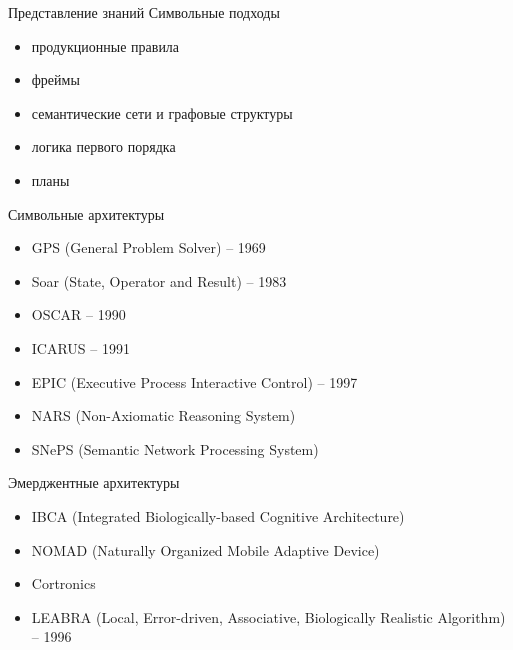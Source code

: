 \documentclass{beamer}
\begin{document}
\begin{frame}{Представление знаний}
Символьные подходы\\
\medskip
\begin{itemize}
	\item продукционные правила
	\item фреймы
	\item семантические сети и графовые структуры
	\item логика первого порядка
	\item планы
	\medskip
\end{itemize}
\end{frame}

\begin{frame}{Символьные архитектуры}
\begin{itemize}
    \item GPS (General Problem Solver) -- 1969
	\item Soar (State, Operator and Result) -- 1983
	\item OSCAR -- 1990
	\item ICARUS -- 1991
	\item EPIC (Executive Process Interactive Control) -- 1997
	\item NARS (Non-Axiomatic Reasoning System)
	\item SNePS (Semantic Network Processing System)
\end{itemize}
\end{frame}

\begin{frame}{Эмерджентные архитектуры}
\begin{itemize}
	\item IBCA (Integrated Biologically-based Cognitive Architecture)
	\item NOMAD (Naturally Organized Mobile Adaptive Device)
	\item Cortronics
	\item LEABRA (Local, Error-driven, Associative, Biologically Realistic Algorithm) -- 1996
\end{itemize}
\end{frame}
\end{document}
